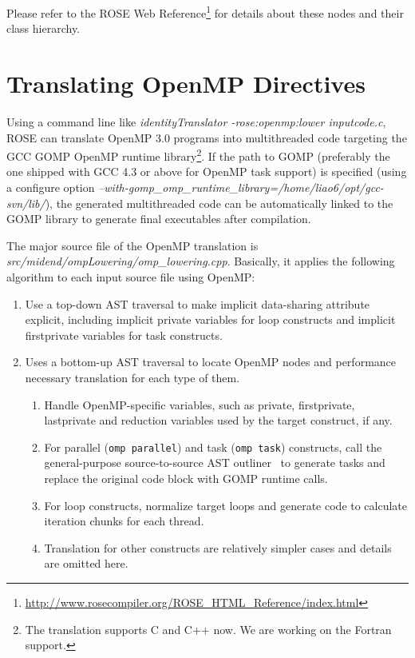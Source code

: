 Please refer to the ROSE Web Reference\footnote{\url{http://www.rosecompiler.org/ROSE_HTML_Reference/index.html}} for details about these nodes and their class hierarchy. 
\section{Translating OpenMP Directives}
Using a command line like \textit{identityTranslator -rose:openmp:lower inputcode.c},
ROSE can translate OpenMP 3.0 programs into multithreaded code targeting
the GCC GOMP OpenMP runtime library\footnote{The translation supports C and
C++ now. We are working on the Fortran support.}.
If the path to GOMP (preferably the one shipped with GCC 4.3 or above for OpenMP task support) is specified (using a configure option \textit{--with-gomp\_omp\_runtime\_library=/home/liao6/opt/gcc-svn/lib/}),
the generated multithreaded code can be automatically linked to the GOMP library to generate final executables after compilation. 

The major source file of the OpenMP translation is \textit{src/midend/ompLowering/omp\_lowering.cpp}. 
Basically, it applies the following algorithm to each input source file using OpenMP:
\begin{enumerate}
\item  Use a top-down AST traversal to make implicit data-sharing attribute explicit, including implicit private variables for loop constructs and implicit firstprivate variables for task constructs. 
\item  Uses a bottom-up AST traversal to locate OpenMP nodes and performance necessary translation for each type of them.
\begin{enumerate}
\item Handle OpenMP-specific variables, such as private, firstprivate, lastprivate and reduction variables used by the target construct, if any.
\item For parallel (\lstinline{omp parallel}) and task (\lstinline{omp task}) constructs, call the general-purpose source-to-source AST outliner~\cite{LiaoEffective2009} to generate tasks and replace the original code block with GOMP runtime calls.
\item For loop constructs, normalize target loops and generate code to
calculate iteration chunks for each thread.
\item Translation for other constructs are relatively simpler cases and
details are omitted here.
\end{enumerate}
\end{enumerate}


